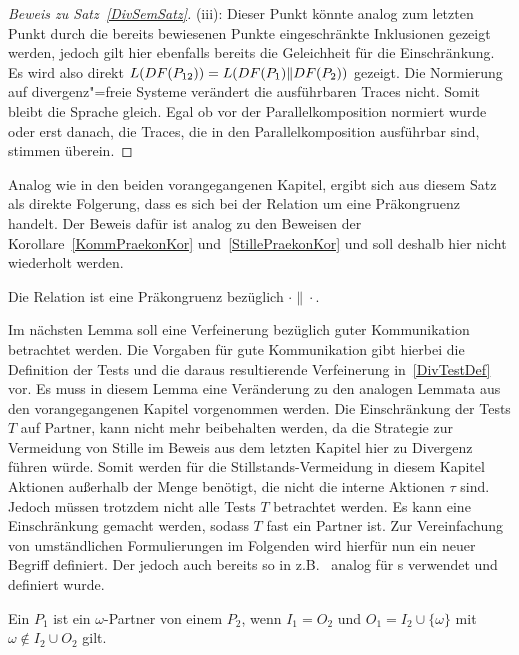 \begin{proof}[Beweis zu Satz~\ref{DivSemSatz}]
  (iii):
  Dieser Punkt könnte analog zum letzten Punkt durch die bereits bewiesenen
  Punkte eingeschränkte Inklusionen gezeigt werden, jedoch gilt hier ebenfalls
  bereits die Geleichheit für die Einschränkung. Es wird also direkt $L (DF
  (P_{12})) = L (DF (P_1)\|DF (P_2))$ gezeigt. Die Normierung auf
  divergenz"=freie Systeme verändert die ausführbaren Traces nicht. Somit bleibt
  die Sprache gleich. Egal ob vor der Parallelkomposition normiert wurde oder
  erst danach, die Traces, die in den Parallelkomposition ausführbar sind,
  stimmen überein.
\end{proof}

Analog wie in den beiden vorangegangenen Kapitel, ergibt sich aus diesem Satz
als direkte Folgerung, dass es sich bei der Relation \DRel{} um eine
Präkongruenz handelt. Der Beweis dafür ist analog zu den Beweisen der
Korollare~\ref{KommPraekonKor} und~\ref{StillePraekonKor} und soll deshalb hier
nicht wiederholt werden.

\begin{Kor}
  Die Relation \DRel{} ist eine Präkongruenz bezüglich $\cdot\|\cdot$.
\end{Kor}

Im nächsten Lemma soll eine Verfeinerung bezüglich guter Kommunikation
betrachtet werden. Die Vorgaben für gute Kommunikation gibt hierbei die
Definition der Tests und die daraus resultierende Verfeinerung
in~\ref{DivTestDef} vor. Es muss in diesem Lemma eine Veränderung zu den
analogen Lemmata aus den vorangegangenen Kapitel vorgenommen werden. Die
Einschränkung der Tests $T$ auf Partner, kann nicht mehr beibehalten werden, da
die Strategie zur Vermeidung von Stille im Beweis aus dem letzten Kapitel hier
zu Divergenz führen würde. Somit werden für die Stillstands-Vermeidung in
diesem Kapitel Aktionen außerhalb der Menge \Synch{} benötigt, die nicht die
interne Aktionen $\tau$ sind. Jedoch müssen trotzdem nicht alle Tests $T$
betrachtet werden. Es kann eine Einschränkung gemacht werden, sodass $T$ fast
ein Partner ist. Zur Vereinfachung von umständlichen Formulierungen im
Folgenden wird hierfür nun ein neuer Begriff definiert. Der jedoch auch bereits
so in z.B.~\cite{Schinko2016BA} analog für \EIO{}s verwendet und definiert
wurde.

\begin{Def}
  Ein \MEIO{} $P_1$ ist ein $\omega$-Partner von einem \MEIO{} $P_2$, wenn
  $I_1=O_2$ und $O_1=I_2\cup\{\omega\}$ mit $\omega\notin I_2\cup O_2$ gilt.
\end{Def}

